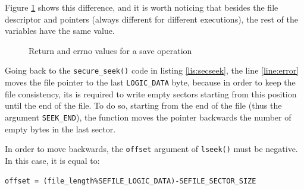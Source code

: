 \vspace{7pt}
Figure \ref{fig:errordebug} shows this difference, and it is worth noticing that besides the file descriptor and pointers (always different for different executions), the rest of the variables have the same value.
\begin{figure}[ht]
  \centering
  {}
  \caption{Return and errno values for a save operation}
 \label{fig:errordebug}
\end{figure}

Going back to the \texttt{secure\_seek()} code in listing \ref{lis:secseek}, the line \ref{line:error} moves the file pointer to the last \texttt{LOGIC\_DATA} byte, because in order to keep the file consistency, its is required to write empty sectors starting from this position until the end of the file. To do so, starting from the end of the file (thus the argument \texttt{SEEK\_END}), the function moves the pointer backwards the number of empty bytes in the last sector.

In order to move backwards, the \texttt{offset} argument of \texttt{lseek()} must be negative. In this case, it is equal to: 

\lstset{style=customc}
\lstinline"offset = (file_length%SEFILE_LOGIC_DATA)-SEFILE_SECTOR_SIZE"

